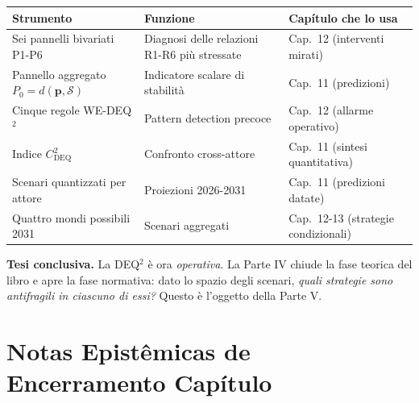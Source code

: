 {\def\LTcaptype{none} %
{\small\begin{longtable}[]{@{}
  >{\raggedright\arraybackslash}p{}
  >{\raggedright\arraybackslash}p{}
  >{\raggedright\arraybackslash}p{}@{}}
\toprule\noalign{}
\begin{minipage}[b]{\linewidth}\raggedright
Strumento
\end{minipage} & \begin{minipage}[b]{\linewidth}\raggedright
Funzione
\end{minipage} & \begin{minipage}[b]{\linewidth}\raggedright
Capítulo che lo usa
\end{minipage} \\
\midrule\noalign{}
\endhead
\bottomrule\noalign{}
\endlastfoot
Sei pannelli bivariati P1-P6 & Diagnosi delle relazioni R1-R6 più
stressate & Cap.~12 (interventi mirati) \\
Pannello aggregato \(P_0 = d(\boldsymbol{p}, \mathcal{S})\) & Indicatore
scalare di stabilità & Cap.~11 (predizioni) \\
Cinque regole WE-DEQ$^2$ & Pattern detection precoce & Cap.~12 (allarme
operativo) \\
Indice \(C_{\text{DEQ}}^2\) & Confronto cross-attore & Cap.~11 (sintesi
quantitativa) \\
Scenari quantizzati per attore & Proiezioni 2026-2031 & Cap.~11
(predizioni datate) \\
Quattro mondi possibili 2031 & Scenari aggregati & Cap.~12-13 (strategie
condizionali) \\
\end{longtable}}
}

\Hypoth{} \textbf{Tesi conclusiva.} La DEQ$^2$ è ora \emph{operativa}. La
Parte IV chiude la fase teorica del libro e apre la fase normativa: dato
lo spazio degli scenari, \emph{quali strategie sono antifragili in
ciascuno di essi?} Questo è l'oggetto della Parte V.



\section{Notas Epistêmicas de Encerramento
Capítulo}\label{note-epistemiche-di-chiusura-capítulo}

